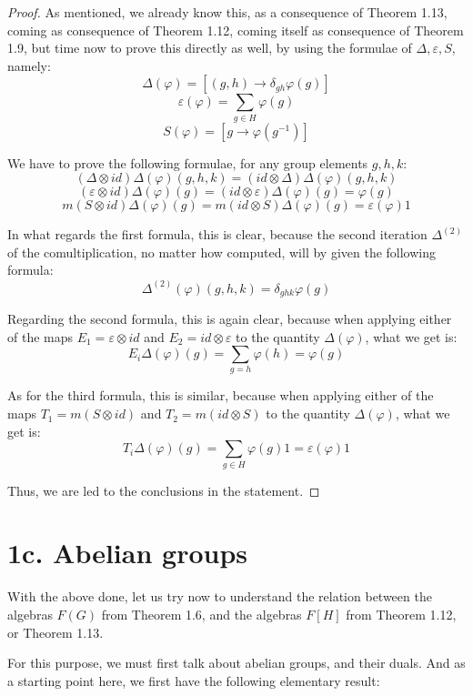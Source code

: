 \documentclass[12pt]{amsbook}
\begin{document}
\begin{proof}
As mentioned, we already know this, as a consequence of Theorem 1.13, coming as consequence of Theorem 1.12, coming itself as consequence of Theorem 1.9, but time now to prove this directly as well, by using the formulae of $\Delta,\varepsilon,S$, namely:
$$\Delta(\varphi)=[(g,h)\to\delta_{gh}\varphi(g)]$$
$$\varepsilon(\varphi)=\sum_{g\in H}\varphi(g)$$ 
$$S(\varphi)=[g\to\varphi(g^{-1})]$$

We have to prove the following formulae, for any group elements $g,h,k$:
$$(\Delta\otimes id)\Delta(\varphi)(g,h,k)=(id\otimes \Delta)\Delta(\varphi)(g,h,k)$$
$$(\varepsilon\otimes id)\Delta(\varphi)(g)=(id\otimes\varepsilon)\Delta(\varphi)(g)=\varphi(g)$$
$$m(S\otimes id)\Delta(\varphi)(g)=m(id\otimes S)\Delta(\varphi)(g)=\varepsilon(\varphi)1$$

In what regards the first formula, this is clear, because the second iteration $\Delta^{(2)}$ of the comultiplication, no matter how computed, will by given the following formula:
$$\Delta^{(2)}(\varphi)(g,h,k)=\delta_{ghk}\varphi(g)$$

Regarding the second formula, this is again clear, because when applying either of the maps $E_1=\varepsilon\otimes id$ and $E_2=id\otimes\varepsilon$ to the quantity $\Delta(\varphi)$, what we get is:
$$E_i\Delta(\varphi)(g)=\sum_{g=h}\varphi(h)=\varphi(g)$$

As for the third formula, this is similar, because when applying either of the maps $T_1=m(S\otimes id)$ and $T_2=m(id\otimes S)$ to the quantity $\Delta(\varphi)$, what we get is:
$$T_i\Delta(\varphi)(g)=\sum_{g\in H}\varphi(g)1=\varepsilon(\varphi)1$$

Thus, we are led to the conclusions in the statement.
\end{proof}

\section*{1c. Abelian groups}

With the above done, let us try now to understand the relation between the algebras $F(G)$ from Theorem 1.6, and the algebras $F[H]$ from Theorem 1.12, or Theorem 1.13. 

\bigskip

For this purpose, we must first talk about abelian groups, and their duals. And as a starting point here, we first have the following elementary result:

\end{document}
